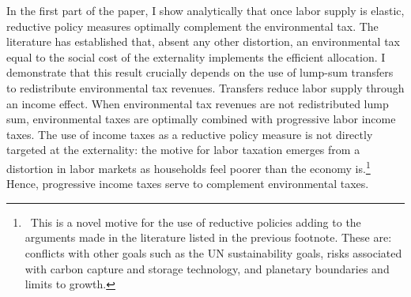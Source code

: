 
In the first part of the paper, I show analytically that once 
labor supply is elastic, reductive policy measures optimally complement the environmental tax. 
The literature has established that, absent any other distortion, an environmental tax equal to the social cost of the externality implements the efficient allocation. 
I demonstrate that this result crucially depends on the use of lump-sum transfers to redistribute environmental tax revenues. Transfers reduce labor supply through an income effect. %
When environmental tax revenues are not redistributed lump sum, environmental taxes are optimally combined with progressive labor income taxes. The use of income taxes as a reductive policy measure is not directly targeted at the externality: the motive for labor taxation emerges from a distortion in labor markets as households feel poorer than the economy is.\footnote{\ This is a novel motive for the use of reductive policies adding to the arguments made in the literature listed in the previous footnote. These are: conflicts with other goals such as the UN sustainability goals, risks associated with carbon capture and storage technology, and planetary boundaries and limits to growth.} 
Hence, progressive income taxes serve to complement environmental taxes. %

